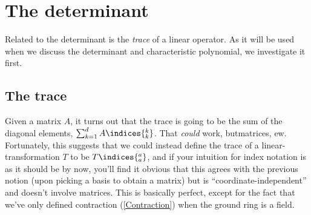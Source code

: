 \section{The determinant}

Related to the determinant is the \emph{trace} of a linear operator.  As it will be used when we discuss the determinant and characteristic polynomial, we investigate it first.

\subsection{The trace}

Given a matrix $A$, it turns out that the trace is going to be the sum of the diagonal elements, $\sum _{k=1}^dA\indices{^k_k}$.  That \emph{could} work, but\textellipsis matrices, ew.  Fortunately, this suggests that we could instead define the trace of a linear-transformation $T$ to be $T\indices{^a_a}$, and if your intuition for index notation is as it should be by now, you'll find it obvious that this agrees with the previous notion (upon picking a basis to obtain a matrix) but is ``coordinate-independent'' and doesn't involve matrices.  This is basically perfect, except for the fact that we've only defined contraction (\cref{Contraction}) when the ground ring is a field.
